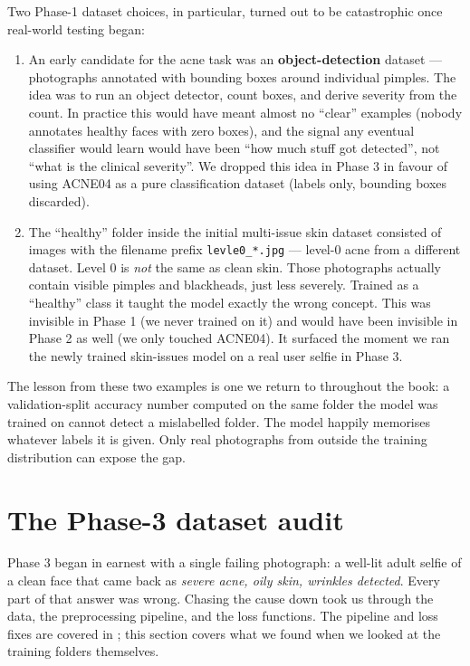 \documentclass[11pt,a4paper,oneside]{report}
\begin{document}
Two Phase-1 dataset choices, in particular, turned out to be
catastrophic once real-world testing began:

\begin{enumerate}
    \item An early candidate for the acne task was an
        \textbf{object-detection} dataset --- photographs annotated
        with bounding boxes around individual pimples. The idea was
        to run an object detector, count boxes, and derive severity
        from the count. In practice this would have meant almost no
        ``clear'' examples (nobody annotates healthy faces with zero
        boxes), and the signal any eventual classifier would learn
        would have been ``how much stuff got detected'', not ``what
        is the clinical severity''. We dropped this idea in Phase 3
        in favour of using ACNE04 as a pure classification dataset
        (labels only, bounding boxes discarded).
    \item The ``healthy'' folder inside the initial multi-issue skin
        dataset consisted of images with the filename prefix
        \texttt{levle0\_*.jpg} --- level-0 acne from a different
        dataset. Level 0 is \emph{not} the same as clean skin.
        Those photographs actually contain visible pimples and
        blackheads, just less severely. Trained as a ``healthy''
        class it taught the model exactly the wrong concept. This
        was invisible in Phase 1 (we never trained on it) and would
        have been invisible in Phase 2 as well (we only touched
        ACNE04). It surfaced the moment we ran the newly trained
        skin-issues model on a real user selfie in Phase 3.
\end{enumerate}

The lesson from these two examples is one we return to throughout
the book: a validation-split accuracy number computed on the same
folder the model was trained on cannot detect a mislabelled folder.
The model happily memorises whatever labels it is given. Only real
photographs from outside the training distribution can expose the
gap.

\section{The Phase-3 dataset audit}

Phase 3 began in earnest with a single failing photograph: a
well-lit adult selfie of a clean face that came back as \emph{severe
acne, oily skin, wrinkles detected}. Every part of that answer was
wrong. Chasing the cause down took us through the data, the
preprocessing pipeline, and the loss functions. The pipeline and
loss fixes are covered in ; this section covers
what we found when we looked at the training folders themselves.
\end{document}
